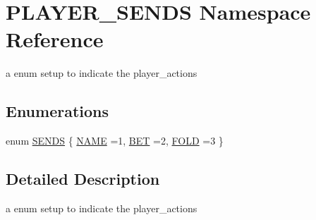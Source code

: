 \hypertarget{namespacePLAYER__SENDS}{\section{P\-L\-A\-Y\-E\-R\-\_\-\-S\-E\-N\-D\-S Namespace Reference}
\label{namespacePLAYER__SENDS}
}


a enum setup to indicate the player\-\_\-actions  


\subsection*{Enumerations}
\begin{DoxyCompactItemize}
\item 
enum \hyperlink{namespacePLAYER__SENDS_a04b35bdc248faeec2b84ffc4417acd1b}{S\-E\-N\-D\-S} \{ \hyperlink{namespacePLAYER__SENDS_a04b35bdc248faeec2b84ffc4417acd1ba2bac6154901696ab889f3b2bff6cec74}{N\-A\-M\-E} =1, 
\hyperlink{namespacePLAYER__SENDS_a04b35bdc248faeec2b84ffc4417acd1ba4bbc90f96af4198691f2700316126077}{B\-E\-T} =2, 
\hyperlink{namespacePLAYER__SENDS_a04b35bdc248faeec2b84ffc4417acd1ba2e080d1d9000064fb7877495be2f3c8f}{F\-O\-L\-D} =3
 \}
\end{DoxyCompactItemize}


\subsection{Detailed Description}
a enum setup to indicate the player\-\_\-actions 

